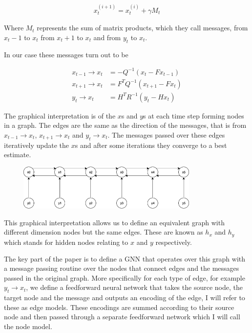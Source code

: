 \documentclass[]{../resources/final_report}
\begin{document}
\begin{align}
  x_t^{(i+1)} = x_t^{(i)} + \gamma M_t
\end{align}

Where $M_t$ represents the sum of matrix products, which they call messages, from $x_t-1$ to $x_t$ 
from $x_t+1$ to $x_t$ and from $y_t$ to $x_t$.

In our case these messages turn out to be

\begin{align}
  x_{t-1} \rightarrow x_{t} &= -Q^{-1}(x_t - Fx_{t-1}) \\
  x_{t+1} \rightarrow x_{t} &= F^TQ^{-1}(x_{t+1} - Fx_t) \\
  y_t \rightarrow x_t &= H^TR^{-1}(y_t - Hx_t) 
\end{align}

  

The graphical interpretation is of the $x$s and $y$s at each time step forming nodes in a graph. The 
edges are the same as the direction of the messages, that is from $x_{t-1} \rightarrow x_t$, $x_{t+1} \rightarrow x_t$ and $y_t \rightarrow x_t$. 
The messages passed over these edges iteratively update the $x$s and after some iterations they 
converge to a best estimate.


\begin{figure}[h]
  \centering
  \includegraphics[width=0.8\textwidth]{GraphicalKalmanModel.png}  
  \caption{}
  \label{}
\end{figure}

This graphical interpretation allows us to define an equivalent graph with different dimension nodes 
but the same edges. These are known as $h_x$ and $h_y$ which stands for hidden nodes relating to $x$ 
and $y$ respectively. 


The key part of the paper is to define a GNN that operates over this graph with a message passing
routine over the nodes that connect edges and the messages passed in the original 
graph. More specifically for each type of edge, for example $y_t \rightarrow x_t$, we define a 
feedforward neural network that takes the source node, the target node and the message and outputs 
an encoding of the edge, I will refer to these as edge models. These encodings are summed according 
to their source node and then passed through a separate feedforward network which I will call the 
node model. 
\end{document}
